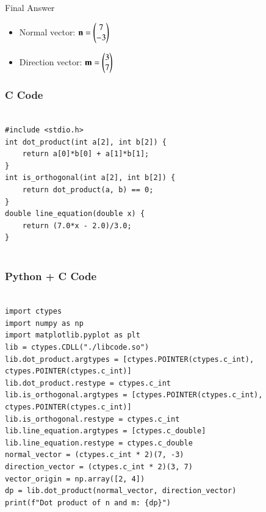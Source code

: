 \documentclass{beamer}
\begin{document}
\begin{frame}{Final Answer}
\begin{itemize}
    \item Normal vector: $\mathbf{n} = \begin{pmatrix}7 \\ -3\end{pmatrix}$
    \item Direction vector: $\mathbf{m} = \begin{pmatrix}3 \\ 7\end{pmatrix}$
\end{itemize}
\end{frame}

\begin{frame}[fragile]
    \frametitle{C Code }

    \begin{lstlisting}

#include <stdio.h>
int dot_product(int a[2], int b[2]) {
    return a[0]*b[0] + a[1]*b[1];
}
int is_orthogonal(int a[2], int b[2]) {
    return dot_product(a, b) == 0;
}
double line_equation(double x) {
    return (7.0*x - 2.0)/3.0;
}


    \end{lstlisting}
\end{frame}

\begin{frame}[fragile]
    \frametitle{Python + C Code }

    \begin{lstlisting}

import ctypes
import numpy as np
import matplotlib.pyplot as plt
lib = ctypes.CDLL("./libcode.so")
lib.dot_product.argtypes = [ctypes.POINTER(ctypes.c_int), ctypes.POINTER(ctypes.c_int)]
lib.dot_product.restype = ctypes.c_int
lib.is_orthogonal.argtypes = [ctypes.POINTER(ctypes.c_int), ctypes.POINTER(ctypes.c_int)]
lib.is_orthogonal.restype = ctypes.c_int
lib.line_equation.argtypes = [ctypes.c_double]
lib.line_equation.restype = ctypes.c_double
normal_vector = (ctypes.c_int * 2)(7, -3)
direction_vector = (ctypes.c_int * 2)(3, 7)
vector_origin = np.array([2, 4])
dp = lib.dot_product(normal_vector, direction_vector)
print(f"Dot product of n and m: {dp}")



    \end{lstlisting}
\end{frame}
\end{document}

